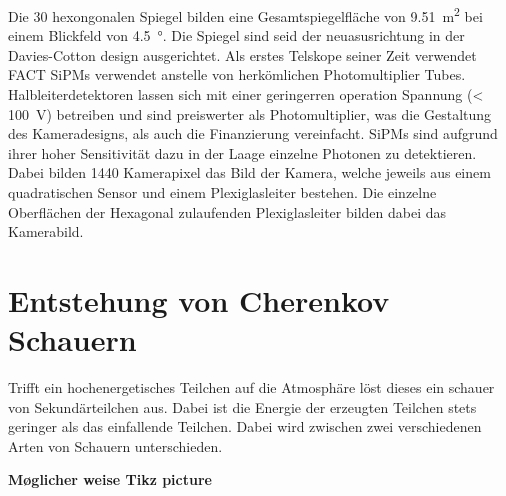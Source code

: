 Die 30 hexongonalen Spiegel bilden eine Gesamtspiegelfläche von \SI{9.51}{\meter\squared} bei einem Blickfeld von \SI{4.5}{\degree}. 
Die Spiegel sind seid der neuasusrichtung in der Davies-Cotton design ausgerichtet. \cite{??} 
Als erstes Telskope seiner Zeit verwendet FACT SiPMs verwendet anstelle von herkömlichen Photomultiplier Tubes. 
Halbleiterdetektoren lassen sich mit einer geringerren operation Spannung (< \SI{100}{\volt}) betreiben und sind preiswerter als Photomultiplier, was die Gestaltung des Kameradesigns, als auch die Finanzierung vereinfacht. 
SiPMs sind aufgrund ihrer hoher Sensitivität dazu in der Laage einzelne Photonen zu detektieren.
Dabei bilden 1440 Kamerapixel das Bild der Kamera, welche jeweils aus einem quadratischen Sensor und einem Plexiglasleiter bestehen. Die einzelne Oberflächen der Hexagonal zulaufenden Plexiglasleiter bilden dabei das Kamerabild.

\section{Entstehung von Cherenkov Schauern}
Trifft ein hochenergetisches Teilchen auf die Atmosphäre löst dieses ein schauer von Sekundärteilchen aus. Dabei ist die Energie der erzeugten Teilchen stets geringer als das einfallende Teilchen. Dabei wird zwischen zwei verschiedenen Arten von Schauern unterschieden. 

\textbf{Møglicher weise Tikz picture}

